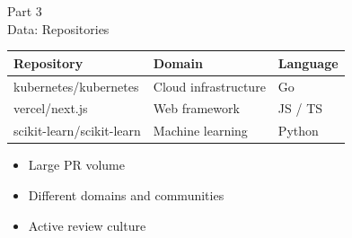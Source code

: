 \documentclass[aspectratio=169,11pt]{beamer}
\begin{document}
\begin{frame}{Part 3\\Data: Repositories}

\begin{center}
\begin{tabular}{lll}
\toprule
\textbf{Repository} & \textbf{Domain} & \textbf{Language} \\
\midrule
kubernetes/kubernetes & Cloud infrastructure & Go \\
vercel/next.js & Web framework & JS / TS \\
scikit-learn/scikit-learn & Machine learning & Python \\
\bottomrule
\end{tabular}
\end{center}

\vspace{0.5em}
\begin{itemize}
  \item Large PR volume
  \item Different domains and communities
  \item Active review culture
\end{itemize}

\end{frame}
\end{document}
